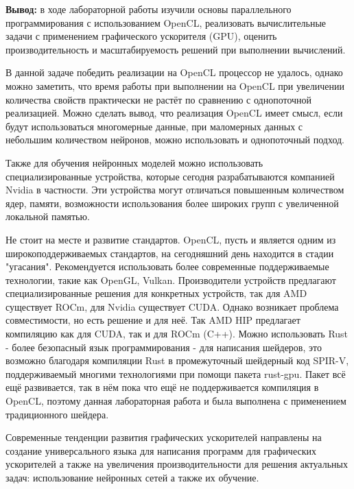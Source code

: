\documentclass[a4paper,14pt]{extarticle}
\begin{document}
\textbf{Вывод: } в ходе лабораторной работы изучили основы параллельного программирования с использованием OpenCL,
реализовать вычислительные задачи с применением графического ускорителя (GPU), оценить
производительность и масштабируемость решений при выполнении вычислений.

В данной задаче победить реализации на OpenCL процессор не удалось, однако
можно заметить, что время работы при выполнении на OpenCL при увеличении
количества свойств практически не растёт по сравнению с однопоточной реализацией.
Можно сделать вывод, что реализация OpenCL имеет смысл, если будут использоваться
многомерные данные, при маломерных данных с небольшим количеством нейронов, 
можно использовать и однопоточный подход.

Также для обучения нейронных моделей можно использовать специализированные
устройства, которые сегодня разрабатываются компанией Nvidia в частности. 
Эти устройства могут отличаться повышенным количеством ядер, памяти, 
возможности использования более широких групп с увеличенной локальной памятью.

Не стоит на месте и развитие стандартов. OpenCL, пусть и является одним из
широкоподдерживаемых стандартов, на сегодняшний день находится в стадии "угасания". 
Рекомендуется использовать более современные поддерживаемые технологии, такие как OpenGL, Vulkan. 
Производители устройств предлагают специализированные решения для конкретных устройств, 
так для AMD существует ROCm, для Nvidia существует CUDA. Однако возникает проблема 
совместимости, но есть решение и для неё. Так AMD HIP предлагает компиляцию как для 
CUDA, так и для ROCm (C++). Можно использовать Rust - более безопасный язык программирования -
для написания шейдеров, это возможно благодаря компиляции Rust в промежуточный шейдерный код SPIR-V, 
поддерживаемый многими технологиями при помощи пакета rust-gpu. Пакет всё ещё развивается, 
так в нём пока что ещё не поддерживается компиляция в OpenCL, поэтому данная лабораторная
работа и была выполнена с применением традиционного шейдера.

Современные тенденции развития графических ускорителей направлены на создание
универсального языка для написания программ для графических ускорителей а 
также на увеличения производительности для решения актуальных задач: использование
нейронных сетей а также их обучение. 
\end{document}
